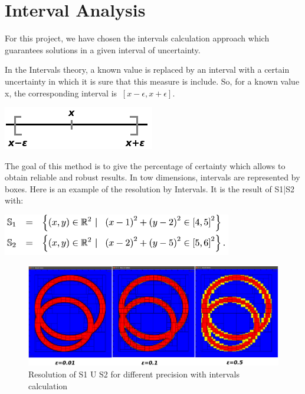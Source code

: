 \documentclass[a4paper,12pt]{report}
\begin{document}
    \section{Interval Analysis}
    
	\vspace{0.5 cm}
	
	 For this project, we have chosen the intervals calculation    approach which guarantees solutions in a given interval of uncertainty.

	\vspace{0.5 cm}
	
	In the Intervals theory, a known value is replaced by an interval with a certain uncertainty in which it is sure that this measure is include. So, for a known value x, the corresponding interval is $\ [x-\epsilon, x+\epsilon] $.


    \begin{center} \includegraphics[scale=0.8]{Interval.png} \end{center}
    
    The goal of this method is to give the percentage of certainty which allows to obtain reliable and robust results. In tow dimensions, intervals are represented by boxes. Here is an example of the resolution by Intervals. It is the result of S1|S2 with:
    
    	\vspace{0.6 cm}
    	

    \begin{center} \includegraphics{Formule1.png} \end{center}
    
    \begin{figure}[!h] 
    \center
    	\includegraphics[scale=0.4]{Boxes.png} 
    	\caption{Resolution of S1 U S2 for different precision with intervals calculation } 
    \label{S1 U S2}
	\end{figure} 
\end{document}
